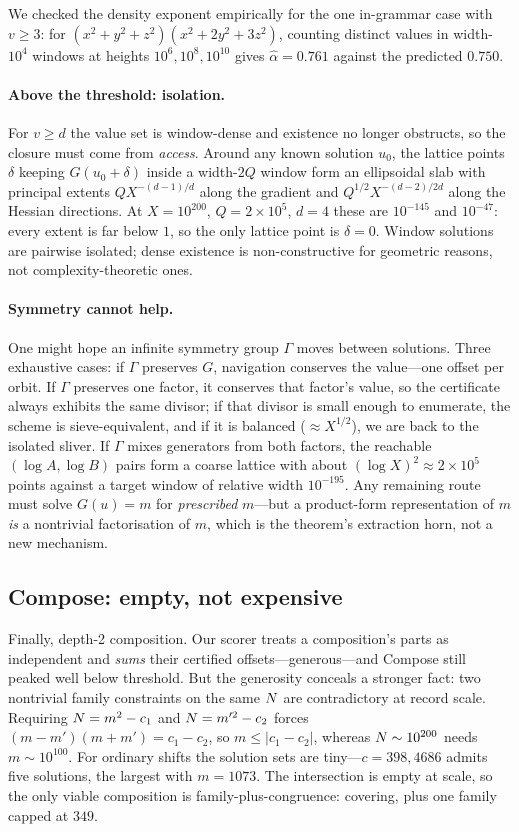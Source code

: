 We checked the density exponent empirically for the one in-grammar case with
$v\ge3$: for $(x^2+y^2+z^2)(x^2+2y^2+3z^2)$, counting distinct values in
width-$10^{4}$ windows at heights $10^{6},10^{8},10^{10}$ gives
$\hat\alpha=0.761$ against the predicted $0.750$.

\paragraph{Above the threshold: isolation.} For $v\ge d$ the value set is
window-dense and existence no longer obstructs, so the closure must come from
\emph{access}. Around any known solution $u_0$, the lattice points $\delta$
keeping $G(u_0+\delta)$ inside a width-$2Q$ window form an ellipsoidal slab with
principal extents $Q X^{-(d-1)/d}$ along the gradient and
$Q^{1/2}X^{-(d-2)/2d}$ along the Hessian directions. At $X=10^{200}$, $Q=2\times
10^{5}$, $d=4$ these are $10^{-145}$ and $10^{-47}$: every extent is far below
$1$, so the only lattice point is $\delta=0$. Window solutions are pairwise
isolated; dense existence is non-constructive for geometric reasons, not
complexity-theoretic ones.

\paragraph{Symmetry cannot help.} One might hope an infinite symmetry group
$\Gamma$ moves between solutions. Three exhaustive cases: if $\Gamma$ preserves
$G$, navigation conserves the value---one offset per orbit. If $\Gamma$ preserves
one factor, it conserves that factor's value, so the certificate always exhibits
the same divisor; if that divisor is small enough to enumerate, the scheme is
sieve-equivalent, and if it is balanced ($\approx X^{1/2}$), we are back to the
isolated sliver. If $\Gamma$ mixes generators from both factors, the reachable
$(\log A,\log B)$ pairs form a coarse lattice with about $(\log X)^{2}\approx
2\times10^{5}$ points against a target window of relative width $10^{-195}$.
Any remaining route must solve $G(u)=m$ for \emph{prescribed} $m$---but a
product-form representation of $m$ \emph{is} a nontrivial factorisation of $m$,
which is the theorem's extraction horn, not a new mechanism.

\subsection{Compose: empty, not expensive}

Finally, depth-2 composition. Our scorer treats a composition's parts as
independent and \emph{sums} their certified offsets---generous---and Compose
still peaked well below threshold. But the generosity conceals a stronger fact:
two nontrivial family constraints on the same $N$ are contradictory at record
scale. Requiring $N=m^{2}-c_1$ and $N=m'^{2}-c_2$ forces
$(m-m')(m+m')=c_1-c_2$, so $m\le|c_1-c_2|$, whereas $N\sim10^{200}$ needs
$m\sim10^{100}$. For ordinary shifts the solution sets are tiny---$c=398,4686$
admits five solutions, the largest with $m=1073$. The intersection is empty at
scale, so the only viable composition is family-plus-congruence: covering, plus
one family capped at $349$.

